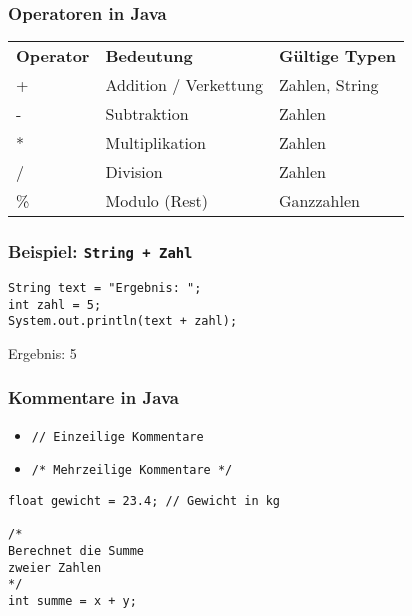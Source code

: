 \documentclass{../../presentation}
\begin{document}
\begin{frame}
  \frametitle{Operatoren in Java}
  \pause
  \centering
  \begin{tabular}{l l l}
    \rowcolor{tablehead}
    \textbf{Operator} & \textbf{Bedeutung}    & \textbf{Gültige Typen} \\
    +                 & Addition / Verkettung & Zahlen, String         \\
    -                 & Subtraktion           & Zahlen                 \\
    *                 & Multiplikation        & Zahlen                 \\
    /                 & Division              & Zahlen                 \\
    \%                & Modulo (Rest)         & Ganzzahlen             \\
  \end{tabular}
\end{frame}

\begin{frame}[fragile]
  \frametitle{Beispiel: \texttt{String + Zahl}}
  \pause
  \begin{verbatim}
String text = "Ergebnis: ";
int zahl = 5;
System.out.println(text + zahl);
  \end{verbatim}
  \pause
  \begin{ausgabe}
    Ergebnis: 5
  \end{ausgabe}
\end{frame}

\begin{frame}[fragile]
  \frametitle{Kommentare in Java}
  \pause
  \begin{itemize}
    \item \texttt{// Einzeilige Kommentare}
    \item \texttt{/* Mehrzeilige Kommentare */}
  \end{itemize}
  \pause
  \vspace{1em}
  \begin{verbatim}
float gewicht = 23.4; // Gewicht in kg

/*
Berechnet die Summe
zweier Zahlen
*/
int summe = x + y;
  \end{verbatim}
\end{frame}
\end{document}
